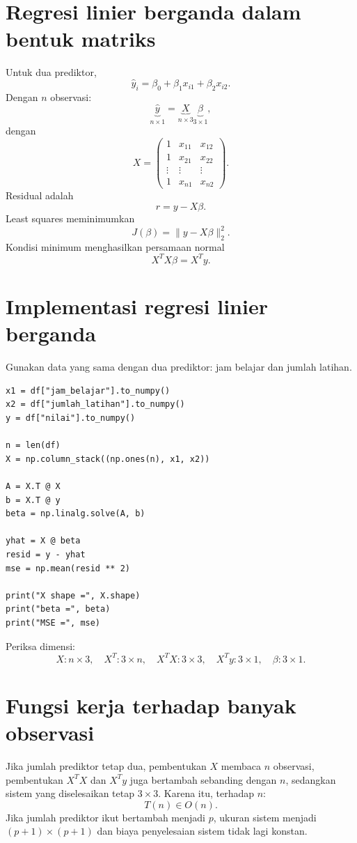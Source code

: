 \documentclass[11pt,a4paper]{report}
\begin{document}
\section{Regresi linier berganda dalam bentuk matriks}
Untuk dua prediktor,
\[
\hat y_i=\beta_0+\beta_1x_{i1}+\beta_2x_{i2}.
\]
Dengan $n$ observasi:
\[
\underbrace{\hat y}_{n\times1}
=
\underbrace{X}_{n\times3}
\underbrace{\beta}_{3\times1},
\]
dengan
\[
X=
\begin{pmatrix}
1&x_{11}&x_{12}\\
1&x_{21}&x_{22}\\
\vdots&\vdots&\vdots\\
1&x_{n1}&x_{n2}
\end{pmatrix}.
\]
Residual adalah
\[
r=y-X\beta.
\]
Least squares meminimumkan
\[
J(\beta)=\|y-X\beta\|_2^2.
\]
Kondisi minimum menghasilkan persamaan normal
\[
X^TX\beta=X^Ty.
\]

\section{Implementasi regresi linier berganda}
Gunakan data yang sama dengan dua prediktor: jam belajar dan jumlah latihan.
\begin{lstlisting}
x1 = df["jam_belajar"].to_numpy()
x2 = df["jumlah_latihan"].to_numpy()
y = df["nilai"].to_numpy()

n = len(df)
X = np.column_stack((np.ones(n), x1, x2))

A = X.T @ X
b = X.T @ y
beta = np.linalg.solve(A, b)

yhat = X @ beta
resid = y - yhat
mse = np.mean(resid ** 2)

print("X shape =", X.shape)
print("beta =", beta)
print("MSE =", mse)
\end{lstlisting}

Periksa dimensi:
\[
X:n\times3,\quad
X^T:3\times n,\quad
X^TX:3\times3,\quad
X^Ty:3\times1,\quad
\beta:3\times1.
\]

\section{Fungsi kerja terhadap banyak observasi}
Jika jumlah prediktor tetap dua, pembentukan $X$ membaca $n$ observasi, pembentukan $X^TX$ dan $X^Ty$ juga bertambah sebanding dengan $n$, sedangkan sistem yang diselesaikan tetap $3\times3$. Karena itu, terhadap $n$:
\[
T(n)\in O(n).
\]
Jika jumlah prediktor ikut bertambah menjadi $p$, ukuran sistem menjadi $(p+1)\times(p+1)$ dan biaya penyelesaian sistem tidak lagi konstan.
\end{document}
